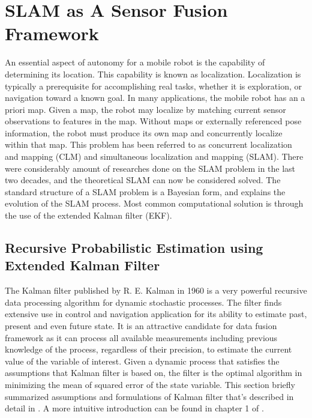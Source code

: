 \section{SLAM as A Sensor Fusion Framework}
\label{sec:SLAM}
An essential aspect of autonomy for a mobile robot is the capability
of determining its location. This capability is known as localization.
Localization is typically a prerequisite for accomplishing real tasks,
whether it is exploration, or navigation toward a known goal. In many
applications, the mobile robot has an a priori map. Given a map, the
robot may localize by matching current sensor observations to features
in the map. Without maps or externally referenced pose information,
the robot must produce its own map and concurrently localize within
that map. This problem has been referred to as concurrent localization
and mapping (CLM) and simultaneous localization and mapping (SLAM).
There were considerably amount of researches done on the SLAM problem in
the last two decades, and the theoretical SLAM can now be considered
solved. The standard structure of a SLAM problem is a Bayesian form,
and explains the evolution of the SLAM process. Most common
computational solution is through the use of the extended Kalman
filter (EKF).

\subsection{Recursive Probabilistic Estimation using Extended Kalman Filter}
\label{sec:SLAM_using_EKF}

The Kalman filter \cite{kalman_new_1960}published by R. E. Kalman in
1960 is a very powerful recursive data processing algorithm for
dynamic stochastic processes. The filter finds extensive use in
control and navigation application for its ability to estimate past,
present and even future state. It is an attractive candidate for data
fusion framework as it can process all available measurements
including previous knowledge of the process, regardless of their
precision, to estimate the current value of the variable of interest.
Given a dynamic process that satisfies the assumptions that Kalman
filter is based on, the filter is the optimal algorithm in minimizing
the mean of squared error of the state variable. This section briefly
summarized assumptions and formulations of Kalman filter that's
described in detail in \cite{sorenson_least-squares_1970}
\cite{analytic_sciences_corporation_applied_1974}
\cite{grewal_kalman_1993} \cite{lewis_optimal_1986}
\cite{brown_introduction_1993}. A more intuitive introduction can be
found in chapter 1 of \cite{maybeck_stochastic_1979}.

